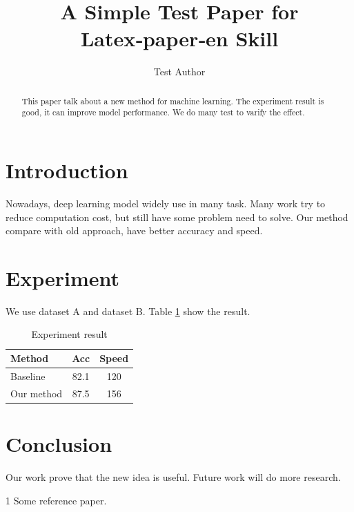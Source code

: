 \documentclass{IEEEtran}
\begin{document}
\title{A Simple Test Paper for Latex‑paper‑en Skill}
\author{Test Author}
\maketitle

\begin{abstract}
This paper talk about a new method for machine learning. The experiment result is good, it can improve model performance. We do many test to varify the effect.
\end{abstract}

\section{Introduction}
Nowadays, deep learning model widely use in many task. Many work try to reduce computation cost, but still have some problem need to solve. Our method compare with old approach, have better accuracy and speed.

\section{Experiment}
We use dataset A and dataset B. Table \ref{tab:res} show the result.

\begin{table}[h]
\caption{Experiment result}
\label{tab:res}
\begin{tabular}{lcc}
\hline
Method & Acc & Speed \\
\hline
Baseline & 82.1 & 120 \\
Our method & 87.5 & 156 \\
\hline
\end{tabular}
\end{table}

\section{Conclusion}
Our work prove that the new idea is useful. Future work will do more research.


\begin{thebibliography}{1}
 Some reference paper.
\end{thebibliography}
\end{document}
